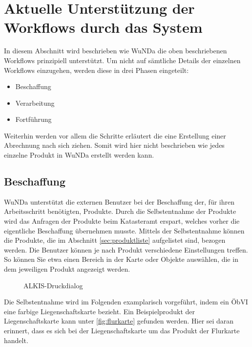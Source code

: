 \section{Aktuelle Unterstützung der Workflows durch das System}

In diesem Abschnitt wird beschrieben wie \ac{WuNDa} die oben beschriebenen Workflows prinzipiell unterstützt.
Um nicht auf sämtliche Details der einzelnen Workflows einzugehen, werden diese in drei Phasen eingeteilt:
\begin{itemize}
 \item Beschaffung
 \item Verarbeitung
 \item Fortführung
\end{itemize}
Weiterhin werden vor allem die Schritte erläutert die eine Erstellung einer Abrechnung nach sich ziehen. Somit wird hier nicht beschrieben wie jedes einzelne Produkt in \ac{WuNDa} erstellt werden kann.

\subsection{Beschaffung} \label{subsec:beschaffung}
\ac{WuNDa} unterstützt die externen Benutzer bei der Beschaffung der, für ihren Arbeitsschritt benötigten, Produkte. Durch die Selbstentnahme der Produkte wird das Anfragen der Produkte beim Katasteramt erspart, welches vorher die eigentliche Beschaffung übernehmen musste. Mittels der Selbstentnahme können die Produkte, die im Abschnitt \ref{sec:produktliste} aufgelistet sind, bezogen werden.
Die Benutzer können je nach Produkt verschiedene Einstellungen treffen. So können Sie etwa einen Bereich in der Karte oder Objekte auswählen, die in dem jeweiligen Produkt angezeigt werden.

\begin{figure}[htb]
	\centering
	\caption{ALKIS-Druckdialog}
	\label{fig:alkis-druck}
\end{figure}

Die Selbstentnahme wird im Folgenden examplarisch vorgeführt, indem ein \ac{ÖbVI} eine farbige Liegenschaftskarte bezieht. Ein Beispielprodukt der Liegenschaftskarte kann unter \ref{fig:flurkarte} gefunden werden. 
Hier sei daran erinnert, dass es sich bei der Liegenschaftskarte um das  Produkt der Flurkarte handelt. 

